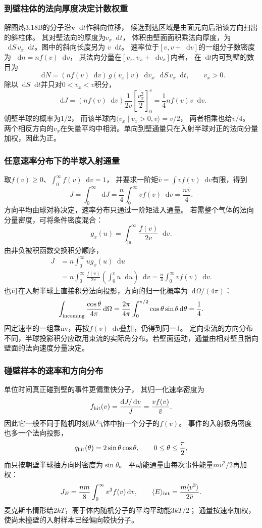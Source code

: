 \documentclass[UTF8,fontset=fandol,a4paper,11pt]{ctexart}
\newcommand{\dd}{\mathop{}\!\mathrm{d}}
\begin{document}
\subsubsection*{到壁柱体的法向厚度决定计数权重}
解图热3.18B的分子沿$\bm v\dd t$作斜向位移，
候选到达区域是由面元向后沿该方向扫出的斜柱体。
其对壁法向的厚度为$v_x\dd t$，
体积由壁面面积乘法向厚度，为 $\dd S\,v_x\dd t$。图中的斜向长度另为 $v\dd t$。
速率位于$[v,v+\dd v]$的一组分子数密度为
$\dd n=nf(v)\dd v$，
其法向分量在$[v_x,v_x+\dd v_x]$内者，
在$\dd t$内可到壁的数目为
\[
\dd N=(nf(v)\dd v)\,
g(v_x\mid v)\dd v_x\,
\dd S\,v_x\dd t,\qquad v_x>0.
\]
除以$\dd S\dd t$并只对$0<v_x<v$积分，
\[
\dd J=(nf(v)\dd v)
\frac1{2v}\left[\frac{v_x^2}{2}\right]_0^v
=\frac14nf(v)v\dd v.
\]
朝壁半球的概率为1/2，
而该半球内$\langle v_x\mid v_x>0,v\rangle=v/2$，
两者相乘也给$v/4$。
两个相反方向的$v_x$在矢量平均中相消。单向到壁通量只在入射半球对正的法向分量加权，因此为正。

\subsubsection*{任意速率分布下的半球入射通量}
取$f(v)\ge0$、$\int_0^\infty f(v)\dd v=1$，
并要求一阶矩$\bar v=\int vf(v)\dd v$有限，得到
\[
J=\int_0^\infty\dd J
=\frac n4\int_0^\infty vf(v)\dd v=\frac{n\bar v}{4}.
\]
方向平均由球对称决定，速率分布只通过一阶矩进入通量。
若需整个气体的法向分量密度，可将条件密度混合：
\[
g_x(u)=\int_{|u|}^\infty\frac{f(v)}{2v}\dd v.
\]
由非负被积函数交换积分顺序，
\[
\begin{aligned}
J&=n\int_0^\infty u g_x(u)\dd u\\
&=n\int_0^\infty\frac{f(v)}{2v}
\left(\int_0^v u\dd u\right)\dd v
=\frac n4\int_0^\infty vf(v)\dd v.
\end{aligned}
\]
也可在入射半球上直接积分法向投影，方向的归一化概率为$\dd\Omega/(4\pi)$：
\[
\int_{\rm incoming}\frac{\cos\theta}{4\pi}\dd\Omega
=\frac{2\pi}{4\pi}
\int_0^{\pi/2}\cos\theta\sin\theta\dd\theta
=\frac14.
\]
固定速率的一组乘nv，再按$f(v)\dd v$叠加，仍得到同一J。
定向束流的方向分布不同，半球投影积分应改用束流的实际角分布。若壁面运动，通量由相对壁且指向壁面的法向速度分量决定。

\subsubsection*{碰壁样本的速率和方向分布}
单位时间真正碰到壁的事件更偏重快分子，
其归一化速率密度为
\[
f_{\rm hit}(v)=\frac{\dd J/\dd v}{J}
=\frac{vf(v)}{\bar v}.
\]
因此它一般不同于随机时刻从气体中抽一个分子的$f(v)$。
事件的入射极角密度也多一个法向投影，
\[
q_{\rm hit}(\theta)=2\sin\theta\cos\theta,
\qquad 0\le\theta\le\frac\pi2,
\]
而只按朝壁半球抽方向时密度为$\sin\theta$。
平动能通量由每次事件能量$mv^2/2$再加权：
\[
J_E=\frac{nm}{8}\int_0^\infty v^3 f(v)\dd v,\qquad
\langle E\rangle_{\rm hit}
=\frac{m\langle v^3\rangle}{2\bar v}.
\]
麦克斯韦情形给$2kT$，高于体内随机分子的平均平动能$3kT/2$；
通量按速率加权，使尚未撞壁的入射样本已经偏向较快分子。
\end{document}
